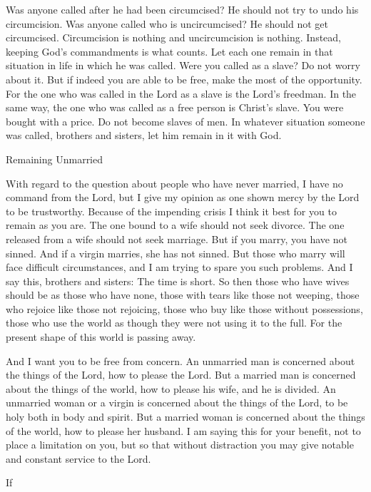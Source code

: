 {Was anyone
called
after
he had been circumcised? He should
not
try to undo his circumcision.
Was anyone
called
who is uncircumcised? He should
not
get circumcised.
Circumcision
is
nothing
and
uncircumcision
is
nothing.
Instead,
keeping
God’s
commandments is what counts.
Let
each one
remain
in
that
situation
in life in which
he was called.
Were you called
as a slave? Do
not
worry
about it. But
if
indeed you are able
to be
free,
make
the most
of the opportunity.
For
the one who was called
in
the Lord
as a slave
is
the Lord’s
freedman.
In the same way,
the one who was called
as a free person
is
Christ’s
slave.
You were bought
with a price.
Do
not
become
slaves
of men.
In
whatever situation
someone
was called,
brothers and sisters,
let him remain
in
it
with
God.
\par }{\SH Remaining Unmarried
\par }{\PP {}With regard
to the question about people who have never married,
I have
no
command
from
the Lord,
but
I give
my opinion
as
one shown mercy
by
the Lord
to be
trustworthy.
Because of
the impending crisis
I think
it best
for you to remain as you are.
The one bound
to a wife
should
not
seek
divorce.
The one released
from
a wife
should
not
seek
marriage.
But
if
you marry,
you have
not
sinned.
And
if
a virgin
marries,
she has
not
sinned.
But
those who marry will face
difficult circumstances,
and I
am trying to spare
you
such problems.
And
I say
this, brothers and sisters: The time
is
short.
So then
those who have
wives
should be
as
those who have
none,
those with tears
like
those not
weeping,
those who rejoice
like
those not
rejoicing,
those who buy
like
those without
possessions,
those who use
the world
as though
they were
not
using
it to the full. For
the present shape
of this
world
is passing away.
\par }{\PP {}And
I want
you
to be
free from concern.
An unmarried man
is concerned
about the things of the Lord,
how
to please
the Lord.
But
a married man
is concerned
about the things of the world,
how
to please
his wife,
and
he is divided.
An unmarried
woman
or
a virgin
is concerned
about the things of the Lord,
to be holy
both
in body
and
spirit.
But
a married woman
is concerned
about the things of the
world,
how
to please
her husband.
I am saying
this
for your
benefit,
not
to
place
a limitation
on you,
but
so that without distraction
you may give notable
and
constant service
to the Lord.
\par }{\PP {}If
}
